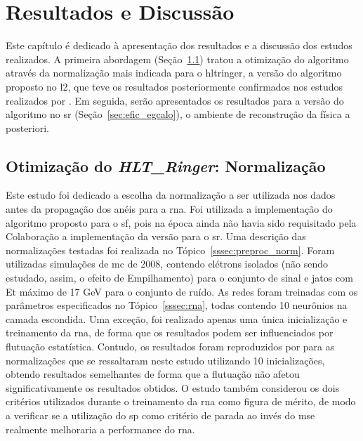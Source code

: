 \chapter{Resultados e Discussão}
\label{cap:resultados}

Este capítulo é dedicado à apresentação dos resultados e a discussão dos estudos
realizados. A primeira abordagem (Seção~\ref{sec:norm}) tratou a otimização do
algoritmo através da normalização mais indicada para o \gls{hltringer}, 
a versão do algoritmo proposto no \glsdesc{l2}, que teve os resultados 
posteriormente confirmados nos estudos realizados
por \cite{tese_torres}. Em seguida, serão apresentados os resultados para a
versão do algoritmo no \gls{sr} (Seção~\ref{sec:efic_egcalo}), o ambiente de
reconstrução da física a posteriori.


\section{Otimização do \emph{HLT\_Ringer}: Normalização}
\label{sec:norm}

Este estudo foi dedicado a escolha da normalização a ser utilizada nos
dados antes da propagação dos anéis para a \gls{rna}. Foi utilizada a
implementação do algoritmo proposto para o \gls{sf}, pois na época ainda não
havia sido requisitado pela Colaboração a implementação da versão para o \gls{sr}. Uma descrição das
normalizações testadas foi realizada no Tópico~\ref{sssec:preproc_norm}. Foram
utilizadas simulações de \gls{mc} de 2008, contendo elétrons isolados (não sendo
estudado, assim, o efeito de Empilhamento) para o conjunto de sinal e jatos com 
\gls{Et} máximo de 17 GeV para o conjunto de ruído. As redes foram treinadas com
os parâmetros especificados no Tópico~\ref{sssec:rna}, todas contendo 10
neurônios na camada escondida. Uma exceção, foi realizado apenas uma única 
inicialização e treinamento da \gls{rna}, de forma que os resultados
podem ser influenciados por flutuação estatística. Contudo, os resultados 
foram reproduzidos por \cite{tese_torres} para as normalizações que se ressaltaram 
neste estudo utilizando 10 inicializações, obtendo resultados semelhantes de 
forma que a flutuação não afetou significativamente os resultados obtidos. O
estudo também considerou os dois critérios utilizados durante o treinamento da
\gls{rna} como figura de mérito, de modo a verificar se a utilização do \gls{sp}
como critério de parada ao invés do \gls{mse} realmente melhoraria a performance
do \gls{rna}.

